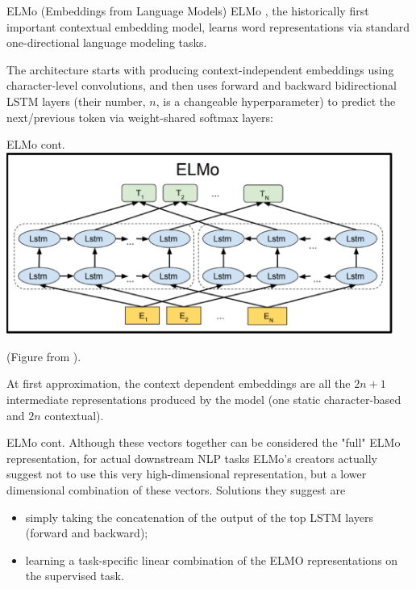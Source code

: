 \documentclass[style=upen, size=14pt]{powerdot}
\theoremstyle{definition}
\begin{document}
\begin{slide}[toc=ELMo]{ELMo (Embeddings from Language Models)}
  ELMo \citep{peters2018deep}, the historically first important contextual
  embedding model, learns word representations via standard one-directional
  language modeling tasks.\bigskip

  The architecture starts with producing context-independent embeddings using
  character-level convolutions, and then uses forward and backward bidirectional
  LSTM layers (their number, $n$, is a changeable hyperparameter) to predict the
  next/previous token via weight-shared softmax layers:
\end{slide}

\begin{slide}[toc=]{ELMo cont.}
  \hspace{0.3cm}\includegraphics[width=0.95\textwidth]{figures/elmo.eps}

  \footnotesize{\hspace{3.3cm}(Figure from \cite{peters2018deep}).}
  
  \normalsize At first approximation, the context dependent embeddings are all
  the $2n +1 $ intermediate representations produced by the model (one static
  character-based and $2n$ contextual).
\end{slide}

\begin{slide}[toc=]{ELMo cont.}
  Although these vectors together can be considered the "full" ELMo
  representation, for actual downstream NLP tasks ELMo's creators actually
  suggest not to use this very high-dimensional representation, but a lower
  dimensional combination of these vectors. Solutions they suggest are
  \begin{itemize}
  \item simply taking the concatenation of the output of the top LSTM layers (forward
    and backward);
  \item learning a task-specific linear combination of the ELMO representations on
    the supervised task.
  \end{itemize}
\end{slide}
\end{document}
